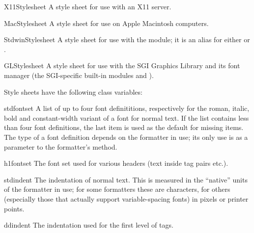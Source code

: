 \begin{datadesc}{X11Stylesheet}
A style sheet for use with an X11 server.
\end{datadesc}

\begin{datadesc}{MacStylesheet}
A style sheet for use on Apple Macintosh computers.
\end{datadesc}

\begin{datadesc}{StdwinStylesheet}
A style sheet for use with the  module; it is an alias
for either  or .
\end{datadesc}

\begin{datadesc}{GLStylesheet}
A style sheet for use with the SGI Graphics Library and its font
manager (the SGI-specific built-in modules  and ).
\end{datadesc}

Style sheets have the following class variables:

\begin{datadesc}{stdfontset}
A list of up to four font definititions, respectively for the roman,
italic, bold and constant-width variant of a font for normal text.  If
the list contains less than four font definitions, the last item is
used as the default for missing items.  The type of a font definition
depends on the formatter in use; its only use is as a parameter to the
formatter's  method.
\end{datadesc}

\begin{datadesc}{h1fontset}
The font set used for various headers (text inside 
tag pairs etc.).
\end{datadesc}

\begin{datadesc}{stdindent}
The indentation of normal text.  This is measured in the ``native''
units of the formatter in use; for some formatters these are
characters, for others (especially those that actually support
variable-spacing fonts) in pixels or printer points.
\end{datadesc}

\begin{datadesc}{ddindent}
The indentation used for the first level of  tags.
\end{datadesc}

